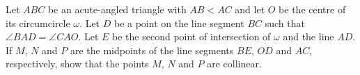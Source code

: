 Let $ABC$ be an acute-angled triangle with $AB < AC$ and let $O$ be the centre of its circumcircle $\omega$.
Let $D$ be a point on the line segment $BC$ such that $\angle BAD = \angle CAO$.
Let $E$ be the second point of intersection of $\omega$ and the line $AD$.
If $M$, $N$ and $P$ are the midpoints of the line segments $BE$, $OD$ and $AC$, respectively, show that the points $M$, $N$ and $P$ are collinear.
